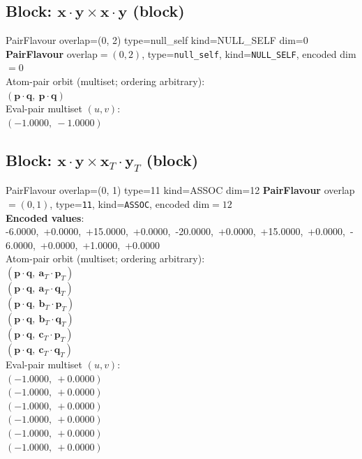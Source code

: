 \documentclass[a4paper,11pt]{article}
\newcommand{\pdcegfomjfhook}[2]{\mathbf{#1} \cdot \mathbf{#2}}
\newcommand{\fpbeomcfokjooi}[2]{\mathbf{#1}_T \cdot \mathbf{#2}_T}
\begin{document}
\subsection{Block: $\pdcegfomjfhook{x}{y} \times \pdcegfomjfhook{x}{y}$  (block)}
    PairFlavour  overlap=(0, 2)  type=null\_self  kind=NULL\_SELF  dim=0
\textbf{PairFlavour} overlap$=(0, 2)$, type=\texttt{null\_self}, kind=\texttt{NULL\_SELF}, encoded dim$=0$\\
\quad Atom-pair orbit (multiset; ordering arbitrary):\\
$(\pdcegfomjfhook{p}{q},\ \pdcegfomjfhook{p}{q})$\\
\quad Eval-pair multiset $(u, v)$:\\
$(-1.0000,\ -1.0000)$\\

\subsection{Block: $\pdcegfomjfhook{x}{y} \times \fpbeomcfokjooi{x}{y}$  (block)}
    PairFlavour  overlap=(0, 1)  type=11  kind=ASSOC  dim=12
\textbf{PairFlavour} overlap$=(0, 1)$, type=\texttt{11}, kind=\texttt{ASSOC}, encoded dim$=12$\\
\textbf{      Encoded values}: -6.0000,\ +0.0000,\ +15.0000,\ +0.0000,\ -20.0000,\ +0.0000,\ +15.0000,\ +0.0000,\ -6.0000,\ +0.0000,\ +1.0000,\ +0.0000\\
\quad Atom-pair orbit (multiset; ordering arbitrary):\\
$(\pdcegfomjfhook{p}{q},\ \fpbeomcfokjooi{a}{p})$\\
$(\pdcegfomjfhook{p}{q},\ \fpbeomcfokjooi{a}{q})$\\
$(\pdcegfomjfhook{p}{q},\ \fpbeomcfokjooi{b}{p})$\\
$(\pdcegfomjfhook{p}{q},\ \fpbeomcfokjooi{b}{q})$\\
$(\pdcegfomjfhook{p}{q},\ \fpbeomcfokjooi{c}{p})$\\
$(\pdcegfomjfhook{p}{q},\ \fpbeomcfokjooi{c}{q})$\\
\quad Eval-pair multiset $(u, v)$:\\
$(-1.0000,\ +0.0000)$\\
$(-1.0000,\ +0.0000)$\\
$(-1.0000,\ +0.0000)$\\
$(-1.0000,\ +0.0000)$\\
$(-1.0000,\ +0.0000)$\\
$(-1.0000,\ +0.0000)$\\
\end{document}
